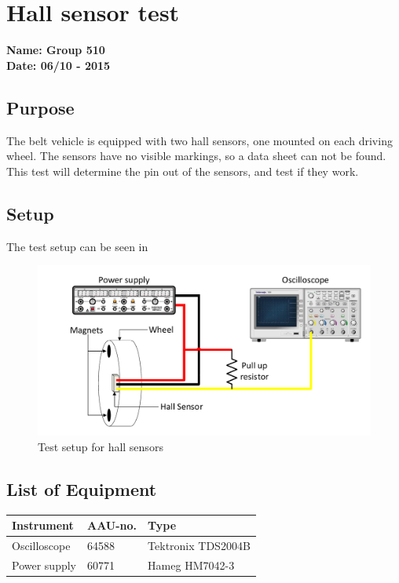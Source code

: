 \chapter{Hall sensor test} %
\textbf{Name: Group 510}\\
\textbf{Date: 06/10 - 2015}

\section*{Purpose}
The belt vehicle is equipped with two hall sensors, one mounted on each driving wheel. The sensors have no visible markings, so a data sheet can not be found. This test will  determine the pin out of the sensors, and test if they work.
\\

\section*{Setup}
The test setup can be seen in 
\begin{figure}[H]
	\centering
	\includegraphics[scale=.6]{figures/hall-test-setup.pdf}
	\flushleft
	\caption{Test setup for hall sensors}
	\label{hallTest}
\end{figure}

\section*{List of Equipment}
\begin{table}[H]
\begin{tabular}{|l|l|p{4cm}|}
\hline%
  \textbf{Instrument}           &  \textbf{AAU-no.}  &  \textbf{Type}    \\
\hline%
  Oscilloscope                  &  64588             &  Tektronix TDS2004B  \\
\hline%
  Power supply							&  60771                  &   Hameg HM7042-3  \\
\hline%

\end{tabular}\\
\end{table}

